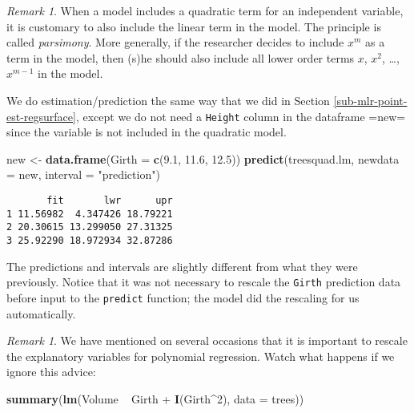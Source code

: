 \documentclass[]{book}
\newenvironment{Shaded}{\begin{snugshade}}{\end{snugshade}}
\newcommand{\KeywordTok}[1]{\textcolor[rgb]{0.13,0.29,0.53}{\textbf{{#1}}}}
\newcommand{\DataTypeTok}[1]{\textcolor[rgb]{0.13,0.29,0.53}{{#1}}}
\newcommand{\DecValTok}[1]{\textcolor[rgb]{0.00,0.00,0.81}{{#1}}}
\newcommand{\FloatTok}[1]{\textcolor[rgb]{0.00,0.00,0.81}{{#1}}}
\newcommand{\StringTok}[1]{\textcolor[rgb]{0.31,0.60,0.02}{{#1}}}
\newcommand{\NormalTok}[1]{{#1}}
\numberwithin{equation}{chapter}
\numberwithin{figure}{chapter}
\theoremstyle{plain}
\theoremstyle{definition}
\theoremstyle{remark}
\newtheorem{rem}[thm]{Remark}
\theoremstyle{definition}
\theoremstyle{definition}
\theoremstyle{remark}
\begin{document}
\bigskip

\begin{rem}
When a model includes a quadratic term for an independent variable, it
is customary to also include the linear term in the model. The principle
is called \emph{parsimony}. More generally, if the researcher decides to
include \(x^{m}\) as a term in the model, then (s)he should also include
all lower order terms \(x\), \(x^{2}\), \ldots{},\(x^{m-1}\) in the
model.
\end{rem}

We do estimation/prediction the same way that we did in Section
\ref{sub-mlr-point-est-regsurface}, except we do not need a
\texttt{Height} column in the dataframe =new= since the variable is not
included in the quadratic model.

\begin{Shaded}
\begin{Highlighting}[]
\NormalTok{new <-}\StringTok{ }\KeywordTok{data.frame}\NormalTok{(}\DataTypeTok{Girth =} \KeywordTok{c}\NormalTok{(}\FloatTok{9.1}\NormalTok{, }\FloatTok{11.6}\NormalTok{, }\FloatTok{12.5}\NormalTok{))}
\KeywordTok{predict}\NormalTok{(treesquad.lm, }\DataTypeTok{newdata =} \NormalTok{new, }\DataTypeTok{interval =} \StringTok{"prediction"}\NormalTok{)}
\end{Highlighting}
\end{Shaded}

\begin{verbatim}
       fit       lwr      upr
1 11.56982  4.347426 18.79221
2 20.30615 13.299050 27.31325
3 25.92290 18.972934 32.87286
\end{verbatim}

The predictions and intervals are slightly different from what they were
previously. Notice that it was not necessary to rescale the
\texttt{Girth} prediction data before input to the \texttt{predict}
function; the model did the rescaling for us automatically.

\bigskip

\begin{rem}
We have mentioned on several occasions that it is important to rescale
the explanatory variables for polynomial regression. Watch what happens
if we ignore this advice:
\end{rem}

\begin{Shaded}
\begin{Highlighting}[]
\KeywordTok{summary}\NormalTok{(}\KeywordTok{lm}\NormalTok{(Volume ~}\StringTok{ }\NormalTok{Girth +}\StringTok{ }\KeywordTok{I}\NormalTok{(Girth^}\DecValTok{2}\NormalTok{), }\DataTypeTok{data =} \NormalTok{trees))}
\end{Highlighting}
\end{Shaded}
\end{document}
